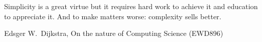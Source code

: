 \thispagestyle{empty}
\vspace*{\fill}
\setlength\epigraphwidth{8cm}
\setlength\epigraphrule{0pt}
\epigraphfontsize{\itshape}
\epigraph{Simplicity is a great virtue but it requires hard work to achieve it and education to appreciate it. And to make matters worse: complexity sells better.}{\textup{Edsger W.\ Dijkstra}, On the nature of Computing Science (EWD896)}
\vspace*{\fill}